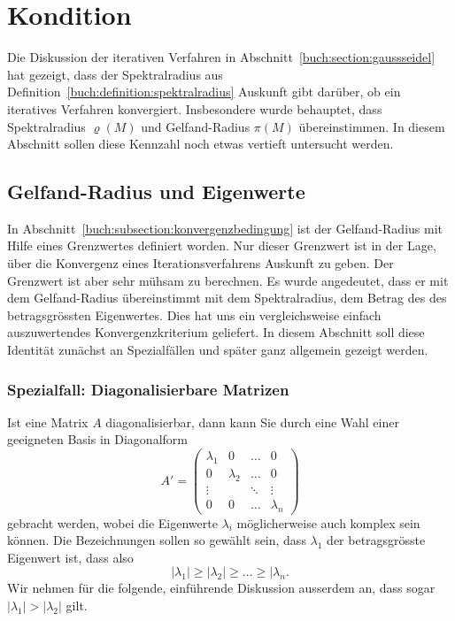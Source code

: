 %
%
%
\section{Kondition
\label{buch:section:kondition}}
Die Diskussion der iterativen Verfahren in
Abschnitt~\ref{buch:section:gaussseidel} hat gezeigt, dass
der Spektralradius aus Definition~\ref{buch:definition:spektralradius}
Auskunft gibt darüber, ob ein iteratives Verfahren konvergiert.
Insbesondere wurde behauptet, dass Spektralradius $\varrho(M)$ und
Gelfand-Radius $\pi(M)$ übereinstimmen.
In diesem Abschnitt sollen diese Kennzahl noch etwas vertieft
untersucht werden.

%
%
\subsection{Gelfand-Radius und Eigenwerte
\label{buch:subsection:spektralradius}}
In Abschnitt~\ref{buch:subsection:konvergenzbedingung}
ist der Gelfand-Radius mit Hilfe eines Grenzwertes definiert worden.
Nur dieser Grenzwert ist in der Lage, über die Konvergenz eines 
Iterationsverfahrens Auskunft zu geben.
Der Grenzwert ist aber sehr mühsam zu berechnen.
Es wurde angedeutet, dass er mit dem Gelfand-Radius übereinstimmt
mit dem Spektralradius, dem Betrag des des betragsgrössten Eigenwertes.
Dies hat uns ein vergleichsweise einfach auszuwertendes Konvergenzkriterium
geliefert.
In diesem Abschnitt soll diese Identität zunächst an Spezialfällen
und später ganz allgemein gezeigt werden.

\subsubsection{Spezialfall: Diagonalisierbare Matrizen}
Ist eine Matrix $A$ diagonalisierbar, dann kann Sie durch eine Wahl
einer geeigneten Basis in Diagonalform
\[
A'
=
\begin{pmatrix}
\lambda_1&        0&\dots &0\\
0        &\lambda_2&\dots &0\\
\vdots   &         &\ddots&\vdots\\
0        &        0&\dots &\lambda_n
\end{pmatrix}
\]
gebracht werden, wobei die Eigenwerte $\lambda_i$  möglicherweise auch
komplex sein können.
Die Bezeichnungen sollen so gewählt sein, dass $\lambda_1$ der
betragsgrösste Eigenwert ist, dass also
\[
|\lambda_1| \ge |\lambda_2| \ge \dots \ge |\lambda_n.
\]
Wir nehmen für die folgende, einführende Diskussion ausserdem an, dass
sogar $|\lambda_1|>|\lambda_2|$ gilt.


